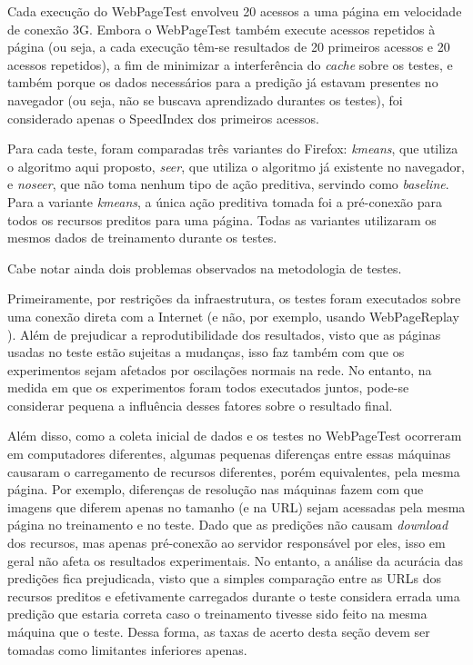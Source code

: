 \documentclass[10pt,twocolumn,letterpaper]{article}
\begin{document}
Cada execução do WebPageTest envolveu 20 acessos a uma página em velocidade de conexão 3G.  Embora o WebPageTest também execute acessos repetidos à página (ou seja, a cada execução têm-se resultados de 20 primeiros acessos e 20 acessos repetidos), a fim de minimizar a interferência do \emph{cache} sobre os testes, e também porque os dados necessários para a predição já estavam presentes no navegador (ou seja, não se buscava aprendizado durantes os testes), foi considerado apenas o SpeedIndex dos primeiros acessos.

Para cada teste, foram comparadas três variantes do Firefox: \emph{kmeans}, que utiliza o algoritmo aqui proposto, \emph{seer}, que utiliza o algoritmo já existente no navegador, e \emph{noseer}, que não toma nenhum tipo de ação preditiva, servindo como \emph{baseline}. Para a variante \emph{kmeans}, a única ação preditiva tomada foi a pré-conexão para todos os recursos preditos para uma página. Todas as variantes utilizaram os mesmos dados de treinamento durante os testes.

Cabe notar ainda dois problemas observados na metodologia de testes.

Primeiramente, por restrições da infraestrutura, os testes foram executados sobre uma conexão direta com a Internet (e não, por exemplo, usando WebPageReplay \cite{WebPageReplay:2013:Online}). Além de prejudicar a reprodutibilidade dos resultados, visto que as páginas usadas no teste estão sujeitas a mudanças, isso faz também com que os experimentos sejam afetados por oscilações normais na rede. No entanto, na medida em que os experimentos foram todos executados juntos, pode-se considerar pequena a influência desses fatores sobre o resultado final.

Além disso, como a coleta inicial de dados e os testes no WebPageTest ocorreram em computadores diferentes, algumas pequenas diferenças entre essas máquinas causaram o carregamento de recursos diferentes, porém equivalentes, pela mesma página. Por exemplo, diferenças de resolução nas máquinas fazem com que imagens que diferem apenas no tamanho (e na URL) sejam acessadas pela mesma página no treinamento e no teste. Dado que as predições não causam \emph{download} dos recursos, mas apenas pré-conexão ao servidor responsável por eles, isso em geral não afeta os resultados experimentais. No entanto, a análise da acurácia das predições fica prejudicada, visto que a simples comparação entre as URLs dos recursos preditos e efetivamente carregados durante o teste considera errada uma predição que estaria correta caso o treinamento tivesse sido feito na mesma máquina que o teste. Dessa forma, as taxas de acerto desta seção devem ser tomadas como limitantes inferiores apenas.
\end{document}
